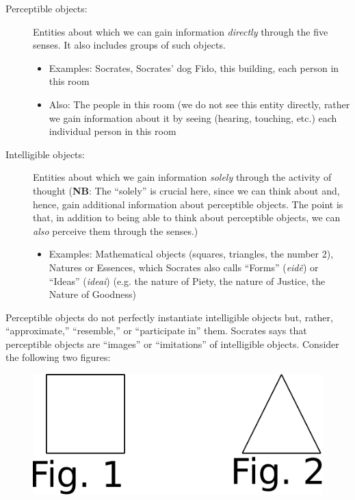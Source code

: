 \documentclass[oneside]{article}
\begin{document}
\begin{description}
\item[Perceptible objects:] Entities about which we can gain information \emph{directly} through the five senses. It also includes groups of such objects.
\begin{itemize}\item{Examples: Socrates, Socrates' dog Fido, this building, each person in this room}\item{Also: The people in this room (we do not see this entity directly, rather we gain information about it by seeing (hearing, touching, etc.) each individual person in this room}\end{itemize}

\item[Intelligible objects:] Entities about which we gain information \emph{solely} through the activity of thought (\textbf{NB}: The ``solely'' is crucial here, since we can think about and, hence, gain additional information about perceptible objects. The point is that, in addition to being able to think about perceptible objects, we can \emph{also} perceive them through the senses.)

\begin{itemize}\item{Examples: Mathematical objects (squares, triangles, the number 2), Natures or Essences, which Socrates also calls ``Forms'' (\emph{eid\^{e}}) or ``Ideas'' (\emph{ideai}) (e.g. the nature of Piety, the nature of Justice, the Nature of Goodness)} %
\end{itemize}

\end{description}
Perceptible objects do not perfectly instantiate intelligible objects but, rather, ``approximate,'' ``resemble,'' or ``participate in'' them. Socrates says that perceptible objects are ``images'' or ``imitations'' of intelligible objects. Consider the following two figures:
\newpage
\begin{figure}[h!]
\hspace*{35mm}
\includegraphics[scale=0.6]{figure1}
\end{figure}
\end{document}
